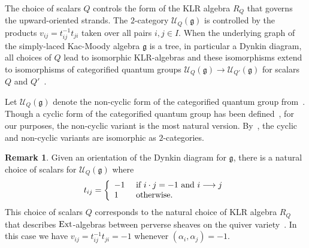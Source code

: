 \documentclass{amsart}
\numberwithin{equation}{section}
\theoremstyle{definition}
\newtheorem{remark}[thm]{Remark}
\def\mf{\mathfrak}
\def\1{\mathbbm{1}}%
\newcommand{\Ucat}{\mathcal{U}_Q}
\renewcommand{\to}{\rightarrow}
\newcommand{\hackcenter}[1]{
 \xy (0,0)*{#1}; \endxy}
\begin{document}
The choice of scalars $Q$ controls the form of the KLR algebra $R_Q$ that governs the upward-oriented strands.  The $2$-category
$\Ucat(\mf{g})$ is controlled by the products $v_{ij}=t_{ij}^{-1}t_{ji}$ taken
over all pairs $i,j\in I$.  When the underlying graph of the simply-laced Kac-Moody algebra $\mf{g}$ is a tree, in particular a Dynkin diagram, all choices of $Q$ lead to isomorphic KLR-algebras and these isomorphisms extend to isomorphisms of categorified quantum groups $\mathcal{U}_Q(\mf{g}) \to \mathcal{U}_{Q'}(\mf{g})$ for scalars $Q$ and $Q'$~\cite{Lau-param}.

Let $\mathcal{U}_Q(\mf{g})$ denote the non-cyclic form of the categorified quantum group from~\cite{Cautis_2014}.  Though a cyclic form of the categorified quantum group has been defined~\cite{BHLW2}, for our purposes, the non-cyclic variant is the most natural version.  By~\cite[Theorem 2.1]{BHLW2}, the cyclic and non-cyclic variants are isomorphic as $2$-categories.

\begin{remark} \label{weylactionstandard}
Given an orientation of the Dynkin diagram for $\mathfrak{g}$, there is a natural choice of scalars for $\mathcal{U}_Q(\mf{g})$ where
\[
t_{ij} =
\left\{
  \begin{array}{ll}
     -1 & \hbox{ if $i \cdot j =-1$ and $i \longrightarrow j$} \\
      1 & \hbox{ otherwise. }
  \end{array}
\right.
\]
This choice of scalars $Q$ corresponds to the natural choice of KLR algebra $R_Q$ that describes ${\rm Ext}$-algebras between perverse sheaves on the quiver variety~\cite{VV}.  In this case we have $v_{ij}=t_{ij}^{-1} t_{ji} = -1$ whenever $(\alpha_i, \alpha_j)=-1$. 
\end{remark}
\end{document}
